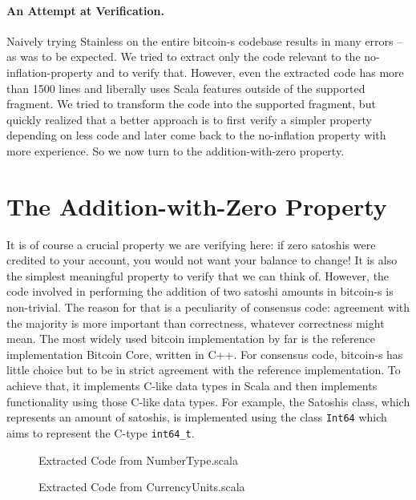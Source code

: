 \documentclass[hyphens, a4paper,USenglish,cleveref, autoref, thm-restate]{oasics-v2019}
\begin{document}
\paragraph{An Attempt at Verification.} Naively trying Stainless on
the entire bitcoin-s codebase results in many errors -- as was to be
expected. We tried to extract only the code relevant to the
no-inflation-property and to verify that. However, even the extracted
code has more than 1500 lines and liberally uses Scala features
outside of the supported fragment. We tried to transform the code into
the supported fragment, but quickly realized that a better approach is
to first verify a simpler property depending on less code and later
come back to the no-inflation property with more experience. So we now
turn to the addition-with-zero property.




\section{The Addition-with-Zero Property}

It is of course a crucial property we are verifying here: if zero
satoshis were credited to your account, you would not want your
balance to change! It is also the simplest meaningful property to
verify that we can think of. However, the code involved in performing
the addition of two satoshi amounts in bitcoin-s is non-trivial. The
reason for that is a peculiarity of consensus code: agreement with the
majority is more important than correctness, whatever correctness
might mean. The most widely used bitcoin implementation by far is the
reference implementation Bitcoin Core, written in C++. For consensus
code, bitcoin-s has little choice but to be in strict agreement with
the reference implementation. To achieve that, it implements C-like
data types in Scala and then implements functionality using those
C-like data types. For example, the Satoshis class, which represents
an amount of satoshis, is implemented using the class \texttt{Int64} which
aims to represent the C-type \texttt{int64\_t}. 

\begin{figure}

  \caption{Extracted Code from NumberType.scala}
  \label{fig:numbertype}
\end{figure}

\begin{figure}

  \caption{Extracted Code from CurrencyUnits.scala}
  \label{fig:currencyunits}
\end{figure}
\end{document}
